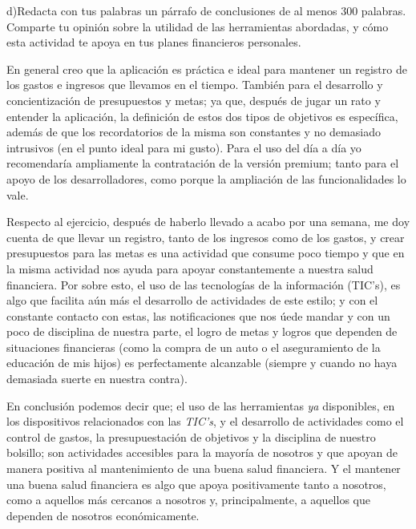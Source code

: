 \documentclass[11pt]{article}
\begin{document}
	d)Redacta con tus palabras un párrafo de conclusiones de al menos 300 palabras. Comparte tu opinión sobre la utilidad de las herramientas abordadas, y cómo esta actividad te apoya en tus planes financieros personales.

	\par En general creo que la aplicación es práctica e ideal para mantener un registro de los gastos e ingresos que llevamos en el tiempo. También para el desarrollo y concientización de presupuestos y metas; ya que, después de jugar un rato y entender la aplicación, la definición de estos dos tipos de objetivos es específica, además de que los recordatorios de la misma son constantes y no demasiado intrusivos (en el punto ideal para mi gusto). Para el uso del día a día yo recomendaría ampliamente la contratación de la versión premium; tanto para el apoyo de los desarrolladores, como porque la ampliación de las funcionalidades lo vale.
	
	\par Respecto al ejercicio, después de haberlo llevado a acabo por una semana, me doy cuenta de que llevar un registro, tanto de los ingresos como de los gastos, y crear presupuestos para las metas es una actividad que consume poco tiempo y que en la misma actividad nos ayuda para apoyar constantemente a nuestra salud financiera. Por sobre esto, el uso de las tecnologías de la información (TIC's), es algo que facilita aún más el desarrollo de actividades de este estilo; y con el constante contacto con estas, las notificaciones que nos úede mandar y con un poco de disciplina de nuestra parte, el logro de metas y logros que dependen de situaciones financieras (como la compra de un auto o el aseguramiento de la educación de mis hijos) es perfectamente alcanzable (siempre y cuando no haya demasiada suerte en nuestra contra).
	
	\par En conclusión podemos decir que; el uso de las herramientas \textit{ya}	disponibles, en los dispositivos relacionados con las \textit{TIC's}, y el desarrollo de actividades como el control de gastos, la presupuestación de objetivos y la disciplina de nuestro bolsillo; son actividades accesibles para la mayoría de nosotros y que apoyan de manera positiva al mantenimiento de una buena salud financiera. Y el mantener una buena salud financiera es algo que apoya positivamente tanto a nosotros, como a aquellos más cercanos a nosotros y, principalmente, a aquellos que dependen de nosotros económicamente.
\end{document}
